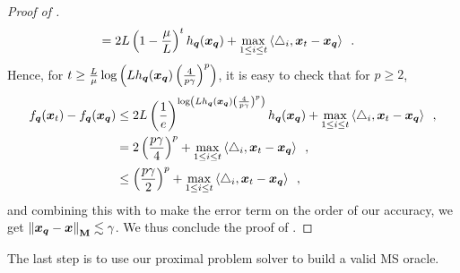 \begin{proof}[Proof of ]
\begin{align*}
    &= 2L\left(1-\frac{\mu}{L}\right)^th_{\bm{q}}(\bm{x}_{\bm{q}})+\max_{1\le i \le t} \left\langle \triangle_i, \bm{x}_t-\bm{x}_{\bm{q}} \right\rangle\enspace.
\end{align*}
Hence, for $t \ge \frac{L}{\mu}\log\left(Lh_{\bm{q}}(\bm{x}_{\bm{q}})\left(\frac{4}{p\gamma}\right)^{p}\right)$, it is easy to check that for $p\geq 2$,
\begin{align*}
    f_{\bm{q}}(\bm{x}_t) - f_{\bm{q}}(\bm{x}_{\bm{q}}) &\leq 2L\left(\frac{1}{e}\right)^{\log\left(Lh_{\bm{q}}(\bm{x}_{\bm{q}})\left(\frac{4}{p\gamma}\right)^{p}\right)}h_{\bm{q}}(\bm{x}_{\bm{q}}) + \max_{1\le i \le t} \left\langle \triangle_i, \bm{x}_t-\bm{x}_{\bm{q}} \right\rangle\enspace,\\
    &= 2\left(\frac{p\gamma}{4}\right)^{p} + \max_{1\le i \le t} \left\langle \triangle_i, \bm{x}_t-\bm{x}_{\bm{q}} \right\rangle\enspace,\\
    &\leq \left(\frac{p\gamma}{2}\right)^{p} + \max_{1\le i \le t} \left\langle \triangle_i, \bm{x}_t-\bm{x}_{\bm{q}} \right\rangle\enspace,
\end{align*}
and combining this with  to make the error term on the order of our accuracy, we get $\left\lVert \bm{x}_{\bm{q}}-\bm{x} \right\rVert_{\mathbf{M}} \lesssim \gamma$. We thus conclude the proof of . 
\end{proof}

The last step is to use our proximal problem solver to build a valid MS oracle.

